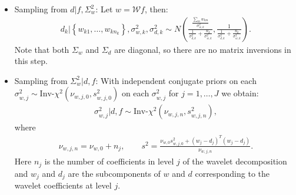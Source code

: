 \documentclass[a4paper,11pt]{article}
\begin{document}
\begin{itemize}
\item Sampling from $d|f,\Sigma^{2}_{w}$: Let $w=\mathcal{W}f$, then:
\begin{align*}
  d_{k} | \left\{w_{k1},\ldots,w_{kn_{k}}\right\}, \sigma^{2}_{w,k}, \sigma^{2}_{d,k} \sim
   N\left(\frac{ \frac{\sum_{m}w_{km}}{\sigma^{2}_{w,k}} }{ {\frac{1}{\sigma^{2}_{d,k}}+\frac{n_{k}}{\sigma_{w,k}^{2}}} }, 
   \frac{1}{\frac{1}{\sigma^{2}_{d,k}}+\frac{n_{k}}{\sigma_{w,k}^{2}}}\right) .
\end{align*}
 Note that both $\Sigma_{w}$ and $\Sigma_{d}$ are diagonal, so there are no matrix inversions in this step.
\item Sampling from $\Sigma^{2}_{w}|d,f$: With independent conjugate priors on each $\sigma^{2}_{w,j}\sim\textrm{Inv-}\chi^{2}(\nu_{w,j,0},s_{w,j,0}^{2})$ on each $\sigma^{2}_{w,j}$ for $j=1,\ldots,J$ we obtain:
\begin{align*}
 \sigma^{2}_{w,j} | d,f \sim \textrm{Inv-}\chi^{2}(\nu_{w,j,n},s_{w,j,n}^{2}) ,
\end{align*} 
where 
\begin{align*}
 \nu_{w,j,n} = \nu_{w,0} + n_{j} , \qquad s^{2} = \frac{\nu_{w,0}s_{w,j,0}^{2}+(w_{j}-d_{j})^{T}(w_{j}-d_{j})}{\nu_{w,j,n}} .
\end{align*}
Here $n_{j}$ is the number of coefficients in level $j$ of the wavelet decomposition and $w_{j}$ and $d_{j}$ are the subcomponents of $w$ and $d$ corresponding to the wavelet coefficients at level $j$.
\end{itemize}
\end{document}
